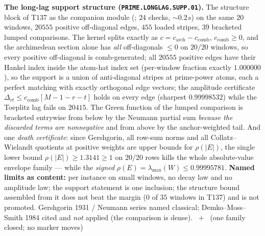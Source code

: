 \par\smallskip\noindent\textbf{The long-lag support structure
(\texttt{PRIME.LONGLAG.SUPP.01}).}
The structure block of T137 as the companion module
(; $24$ checks, ${\sim}0.2$\,s) on the same $20$
windows, $20555$ positive off-diagonal edges, $455$ loaded stripes, $39$
bracketed lumped comparisons. The kernel splits exactly as
$c=c_{\mathrm{arch}}-c_{\mathrm{comb}}$, $c_{\mathrm{comb}}\ge0$, and the
archimedean section alone has \emph{all} off-diagonals $\le0$ on $20/20$ windows,
so every positive off-diagonal is comb-generated; all $20555$ positive edges have
their Hankel index inside the atom-hat index set (per-window fraction exactly
$1.000000$), so the support is a union of anti-diagonal stripes at prime-power
atoms, each a perfect matching with exactly orthogonal edge vectors; the
amplitude certificate $\Delta_{rt}\le c_{\mathrm{comb}}[M-1-r-t]$ holds on every
edge (sharpest $0.99998532$) while the Toeplitz lag fails on $20415$. The Green
function of the lumped comparison is bracketed entrywise from below by the
Neumann partial sum \emph{because the discarded terms are nonnegative} and from
above by the anchor-weighted tail. And one \emph{death certificate}: since
Gershgorin, all row-sum norms and all Collatz--Wielandt quotients at positive
weights are upper bounds for $\rho(|E|)$, the single lower bound
$\rho(|E|)\ge1.3141\ge1$ on $20/20$ rows kills the whole absolute-value envelope
family --- while the \emph{signed} $\rho(E)=\lambda_{\max}(W)\le0.99995781$.
\textbf{Named limits as content:} per instance on small windows, no decay law and
no amplitude law; the support statement is one inclusion; the structure bound
assembled from it does not beat the margin ($0$ of $35$ windows in T137) and is
not promoted. Gershgorin 1931 / Neumann series named classical;
Demko--Moss--Smith 1984 cited and \emph{not} applied (the comparison is dense).
\mE\ $+$ \mX\ (one family closed; no marker moves)
\par\smallskip


